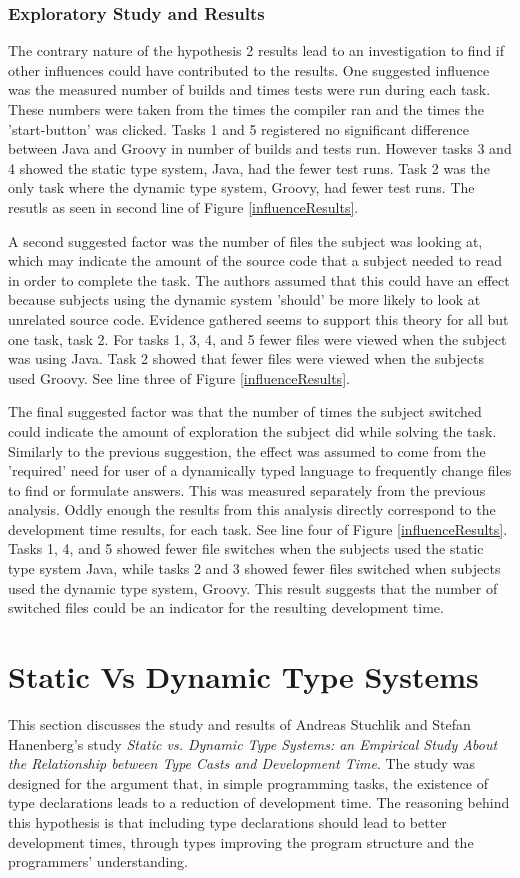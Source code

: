 \documentclass{sig-alternate}
\begin{document}
\subsubsection{Exploratory Study and Results}
The contrary nature of the hypothesis 2 results lead to an investigation to find if other influences could have contributed to the results. One suggested influence was the measured number of builds and times tests were run during each task. These numbers were taken from the times the compiler ran and the times the 'start-button' was clicked. Tasks 1 and 5 registered no significant difference between Java and Groovy in number of builds and tests run. However tasks 3 and 4 showed the static type system, Java, had the fewer test runs. Task 2 was the only task where the dynamic type system, Groovy, had fewer test runs. The resutls as seen in second line of Figure \ref{influenceResults}.  

A second suggested factor was the number of files the subject was looking at, which may indicate the amount of the source code that a subject needed to read in order to complete the task. The authors assumed that this could have an effect because subjects using the dynamic system 'should' be more likely to look at unrelated source code. Evidence gathered seems to support this theory for all but one task, task 2. For tasks 1, 3, 4, and 5 fewer files were viewed when the subject was using Java. Task 2 showed that fewer files were viewed when the subjects used Groovy. See line three of Figure \ref{influenceResults}.

The final suggested factor was that the number of times the subject switched could indicate the amount of exploration the subject did while solving the task. Similarly to the previous suggestion, the effect was assumed to come from the 'required' need for user of a dynamically typed language to frequently change files to find or formulate answers. This was measured separately from the previous analysis. Oddly enough the results from this analysis directly correspond to the development time results, for each task. See line four of Figure \ref{influenceResults}. Tasks 1, 4, and 5 showed fewer file switches when the subjects used the static type system Java, while tasks 2 and 3 showed fewer files switched when subjects used the dynamic type system, Groovy. This result suggests that the number of switched files could be an indicator for the resulting development time. 

\section{Static Vs Dynamic Type Systems}\label{benifits}
This section discusses the study and results of Andreas Stuchlik and Stefan Hanenberg's study \emph{Static vs. Dynamic Type Systems: an Empirical Study About the Relationship between Type Casts and Development Time}\cite{Stuchlik2011}. The study was designed for the argument that, in simple programming tasks, the existence of type declarations leads to a reduction of development time. The reasoning behind this hypothesis is that including type declarations should lead to better development times, through types improving the program structure and the programmers' understanding.
\end{document}
